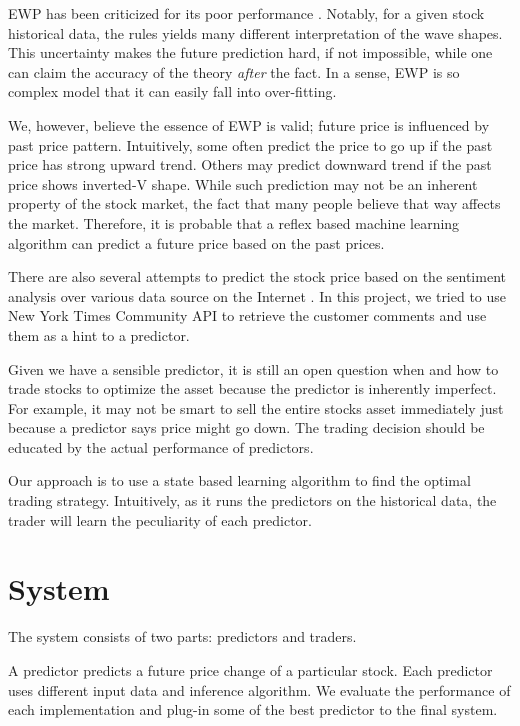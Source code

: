 \documentclass[twocolumn,10pt]{asme2ej}
\begin{document}
EWP has been criticized for its poor performance
\cite{aronson2007evidence-based}. Notably, for a given stock
historical data, the rules yields many different interpretation of the
wave shapes. This uncertainty makes the future prediction hard, if not
impossible, while one can claim the accuracy of the theory
\emph{after} the fact. In a sense, EWP is so complex
model that it can easily fall into over-fitting.

We, however, believe the essence of EWP is valid; future price is influenced by
past price pattern. Intuitively, some often predict the price to go up if the
past price has strong upward trend. Others may predict downward trend if the
past price shows inverted-V shape. While such prediction may not be an inherent
property of the stock market, the fact that many people believe that way affects
the market. Therefore, it is probable that a reflex based machine learning
algorithm can predict a future price based on the past prices.

There are also several attempts to predict the stock price based on
the sentiment analysis over various data source on the Internet
\cite{arXiv:1010.3003}. In this project, we tried to use New York
Times Community API \cite{web:nytimes_community_api} to retrieve the
customer comments and use them as a hint to a predictor.

Given we have a sensible predictor, it is still an open question when and how to
trade stocks to optimize the asset because the predictor is inherently
imperfect. For example, it may not be smart to sell the entire stocks asset
immediately just because a predictor says price might go down. The trading
decision should be educated by the actual performance of predictors.

Our approach is to use a state based learning algorithm to find the
optimal trading strategy. Intuitively, as it runs the predictors on
the historical data, the trader will learn the peculiarity of each
predictor. 

\section{System}

The system consists of two parts: predictors and traders.

A predictor predicts a future price change of a particular
stock. Each predictor uses different input data and inference
algorithm. We evaluate the performance of each implementation and
plug-in some of the best predictor to the final system.
\end{document}
